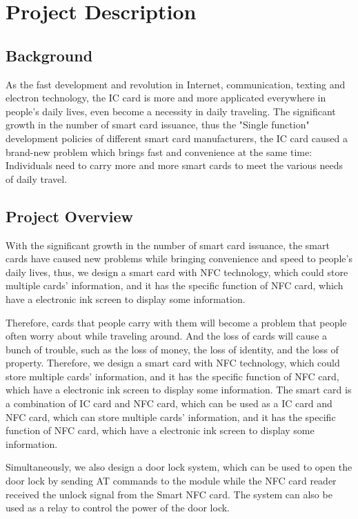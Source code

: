 \documentclass[11pt, a4paper]{article}
\begin{document}
\newpage

\section{Project Description}

\subsection{Background}

As the fast development and revolution in Internet, communication, texting and electron technology, the IC card is more and more applicated everywhere in people's daily lives, even become a necessity in daily traveling.
The significant growth in the number of smart card issuance, thus the "Single function" development policies of different smart card manufacturers, the IC card caused a brand-new problem which brings fast and convenience at the same time: Individuals need to carry more and more smart cards to meet the various needs of daily travel.

\subsection{Project Overview}
With the significant growth in the number of smart card issuance, the smart cards have caused new problems while bringing convenience and speed to people's daily lives, thus, we design a smart card with NFC technology, which could store multiple cards' information, and it has the specific function of NFC card, which have a electronic ink screen to display some information.

Therefore, cards that people carry with them will become a problem that people often worry about while traveling around. And the loss of cards will cause a bunch of trouble, such as the loss of money, the loss of identity, and the loss of property. Therefore, we design a smart card with NFC technology, which could store multiple cards' information, and it has the specific function of NFC card, which have a electronic ink screen to display some information.
The smart card is a combination of IC card and NFC card, which can be used as a IC card and NFC card, which can store multiple cards' information, and it has the specific function of NFC card, which have a electronic ink screen to display some information.

Simultaneously, we also design a door lock system, which can be used to open the door lock by sending AT commands to the module while the NFC card reader received the unlock signal from the Smart NFC card.
The system can also be used as a relay to control the power of the door lock.
\end{document}
